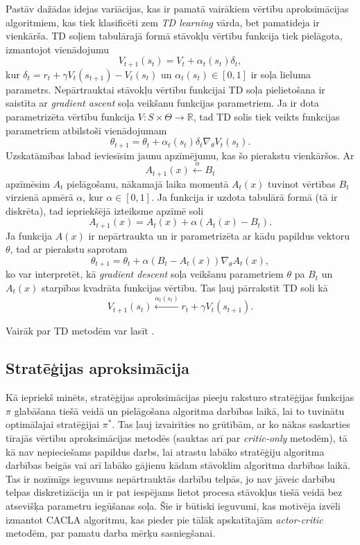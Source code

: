 \documentclass{ludis} %
\begin{document}
Pastāv dažādas
idejas variācijas, kas ir pamatā vairākiem vērtību aproksimācijas algoritmiem,
kas tiek klasificēti zem \textit{TD learning} vārda, bet pamatideja ir
vienkārša. TD soļiem tabulārajā formā stāvokļu vērtību funkcija tiek pielāgota,
izmantojot vienādojumu
\[
	V_{t+1}(s_t) = V_t + \alpha_t(s_t) \delta_t,
\]
kur $\delta_t = r_{t} + \gamma V_t(s_{t + 1}) - V_t(s_t)$ un $\alpha_t(s_t) \in
[0,1]$ ir soļa lieluma parametrs.
Nepārtrauktai stāvokļu vērtību funkcijai TD soļa pielietošana ir saistīta ar
\textit{gradient ascent} soļa veikšanu funkcijas parametriem. Ja ir dota
parametrizēta vērtību funkcija $V:S \times \Theta \rightarrow \mathbb{R}$, tad
TD solis tiek veikts funkcijas parametriem atbilstoši vienādojumam
\[
	\theta_{t+1} = \theta_t + \alpha_t(s_t) \delta_t \nabla_\theta V_t(s_t).
\]
Uzskatāmības labad ieviesīsim jaunu apzīmējumu, kas šo pierakstu vienkāršos.
Ar
\[
	A_{t+1}(x) \xleftarrow{\alpha} B_t
\]
apzīmēsim $A_t$ pielāgošanu, nākamajā laika momentā $A_t(x)$ tuvinot vērtības
$B_t$ virzienā apmērā $\alpha$, kur $\alpha \in [0,1]$. Ja funkcija ir uzdota
tabulārā formā (tā ir diskrēta), tad iepriekšējā izteiksme apzīmē soli
\[
	A_{t+1}(x) = A_t(x) + \alpha(A_t(x) - B_t).
\]
Ja funkcija $A(x)$ ir nepārtraukta un ir parametrizēta ar kādu papildus vektoru
$\theta$, tad ar pierakstu saprotam
\[
	\theta_{t+1} = \theta_t + \alpha \left(B_t - A_t(x)\right) \nabla_\theta A_t(x),
\]
ko var interpretēt, kā \textit{gradient descent} soļa veikšanu parametriem
$\theta$ pa $B_t$ un $A_t(x)$ starpības kvadrāta funkcijas vērtību. Tas ļauj
pārrakstīt TD soli kā
\[
	V_{t+1}(s_t) \xleftarrow{\alpha_t(s_t)} r_t + \gamma V_t(s_{t + 1}).
\]

Vairāk par TD metodēm var lasīt \autocite{Hasselt2012}.

\subsection{Stratēģijas aproksimācija}
Kā iepriekš minēts, stratēģijas aproksimācijas pieeju raksturo stratēģijas
funkcijas $\pi$ glabāšana tiešā veidā un pielāgošana algoritma darbības laikā,
lai to tuvinātu optimālajai stratēģijai $\pi^*$. Tas ļauj izvairīties no
grūtībām, ar ko nākas saskarties tīrajās vērtību aproksimācijas metodēs (sauktas
arī par \textit{critic-only} metodēm), tā kā
nav nepieciešams papildus darbs, lai atrastu labāko stratēģiju algoritma
darbības beigās vai arī labāko gājienu kādam stāvoklim algoritma darbības
laikā. Tas ir nozīmīgs ieguvums nepārtrauktās darbību telpās, jo nav jāveic
darbību telpas diskretizācija un ir pat iespējams lietot procesa stāvokļus
tiešā veidā bez atsevišķa parametru iegūšanas soļa. Šie ir būtiski ieguvumi, kas
motivēja izvēli izmantot CACLA algoritmu, kas pieder pie tālāk apskatītajām
\textit{actor-critic} metodēm, par pamatu darba mērķu sasniegšanai.
\end{document}
